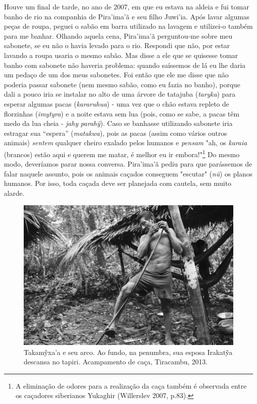Houve um final de tarde, no ano de 2007, em que eu estava na aldeia e
fui tomar banho de rio na companhia de Pira'ima'ã e seu filho Juwi'ia.
Após lavar algumas peças de roupa, peguei o sabão em barra utilizado na
lavagem e utilizei-o também para me banhar. Olhando aquela cena,
Pira'ima'ã perguntou-me sobre meu sabonete, se eu não o havia levado
para o rio. Respondi que não, por estar lavando a roupa usaria o mesmo
sabão. Mas disse a ele que se quisesse tomar banho com sabonete não
haveria problema: quando saíssemos de lá eu lhe daria um pedaço de um
dos meus sabonetes. Foi então que ele me disse que não poderia passar
sabonete (nem mesmo sabão, como eu fazia no banho), porque dali a pouco
iria se instalar no alto de uma árvore de tatajuba (\emph{taryka}) para
esperar algumas pacas (\emph{kararuhua}) - uma vez que o chão estava
repleto de florzinhas (\emph{imytyra}) e a noite estava sem lua (pois,
como se sabe, a pacas têm medo da lua cheia - \emph{jahy}
\emph{parahỹ}). Caso se banhasse utilizando sabonete iria estragar sua
``espera'' (\emph{matakwa}), pois as pacas (assim como vários outros
animais) \emph{sentem} qualquer cheiro exalado pelos humanos e
\emph{pensam} "ah, os \emph{karaia} (brancos) estão aqui e querem me
matar, é melhor eu ir embora!"\footnote{A eliminação de odores para a
  realização da caça também é observada entre os caçadores siberianos
  Yukaghir (Willerslev 2007, p.83).} Do mesmo modo, deveríamos parar
nossa conversa. Pira'ima'ã pediu para que parássemos de falar naquele
assunto, pois os animais caçados conseguem "escutar" (\emph{nũ}) os
planos humanos. Por isso, toda caçada deve ser planejada com cautela,
sem muito alarde.

\begin{figure}[H]
\centering
  \includegraphics[width=\textwidth]{./imgs/IMG_1669}
\caption{Takamỹxa'a e seu arco. Ao fundo, na penumbra, sua esposa Irakatỹa descansa no tapiri. Acampamento de caça, Tiracambu, 2013.}
\end{figure}

